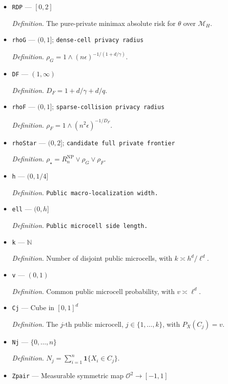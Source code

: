 \documentclass{article}
\begin{document}
\begin{itemize}
  \item \texttt{RDP} --- \([0,2]\)
  \par\smallskip\noindent\emph{Definition.} The pure-private minimax absolute risk for \(\theta\) over \(\mathcal M_H\).
  \item \texttt{rhoG} --- \((0,1]\); \texttt{dense-\allowbreak{}cell privacy radius}
  \par\smallskip\noindent\emph{Definition.} \(\rho_G=1\wedge(n\epsilon)^{-1/(1+d/\gamma)}\).
  \item \texttt{DF} --- \((1,\infty)\)
  \par\smallskip\noindent\emph{Definition.} \(D_F=1+d/\gamma+d/q\).
  \item \texttt{rhoF} --- \((0,1]\); \texttt{sparse-\allowbreak{}collision privacy radius}
  \par\smallskip\noindent\emph{Definition.} \(\rho_F=1\wedge(n^2\epsilon)^{-1/D_F}\).
  \item \texttt{rhoStar} --- \((0,2]\); \texttt{candidate full private frontier}
  \par\smallskip\noindent\emph{Definition.} \(\rho_\star=R_n^{\mathrm{NP}}\vee\rho_G\vee\rho_F\).
  \item \texttt{h} --- \((0,1/4]\)
  \par\smallskip\noindent\emph{Definition.} \texttt{Public macro-\allowbreak{}localization width.}
  \item \texttt{ell} --- \((0,h]\)
  \par\smallskip\noindent\emph{Definition.} \texttt{Public microcell side length.}
  \item \texttt{k} --- \(\mathbb N\)
  \par\smallskip\noindent\emph{Definition.} Number of disjoint public microcells, with \(k\asymp h^d/\ell^d\).
  \item \texttt{v} --- \((0,1)\)
  \par\smallskip\noindent\emph{Definition.} Common public microcell probability, with \(v\asymp\ell^d\).
  \item \texttt{Cj} --- Cube in \([0,1]^d\)
  \par\smallskip\noindent\emph{Definition.} The \(j\)-th public microcell, \(j\in\{1,\ldots,k\}\), with \(P_X(C_j)=v\).
  \item \texttt{Nj} --- \(\{0,\ldots,n\}\)
  \par\smallskip\noindent\emph{Definition.} \(N_j=\sum_{i=1}^n\mathbf 1\{X_i\in C_j\}\).
  \item \texttt{Zpair} --- Measurable symmetric map \(\mathcal O^2\to[-1,1]\)

\end{itemize}
\end{document}
